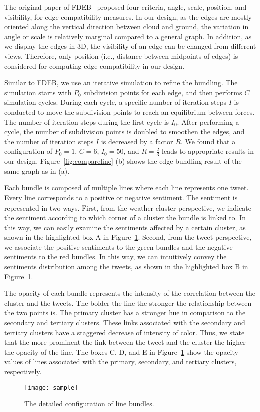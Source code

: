 The original paper of FDEB~\cite{holten2009force} proposed four criteria, angle, scale, position, and visibility, for edge compatibility measures. In our design, as the edges are mostly oriented along the vertical direction between cloud and ground, the variation in angle or scale is relatively marginal compared to a general graph. In addition, as we display the edges in 3D, the visibility of an edge can be changed from different views. Therefore, only position (i.e., distance between midpoints of edges) is considered for computing edge compatibility in our design.

Similar to FDEB, we use an iterative simulation to refine the bundling. The simulation starts with $P_0$ subdivision points for each edge, and then performs $C$ simulation cycles. During each cycle, a specific number of iteration steps $I$ is conducted to move the subdivision points to reach an equilibrium between forces. The number of iteration steps during the first cycle is $I_0$. After performing a cycle, the number of subdivision points is doubled to smoothen the edges, and the number of iteration steps $I$ is decreased by a factor $R$. We found that a configuration of $P_0=1$, $C=6$, $I_0=50$, and $R=\frac{2}{3}$ leads to appropriate results in our design. Figure~\ref{fig:compareline} (b) shows the edge bundling result of the same graph as in (a).

Each bundle is composed of multiple lines where each line represents one tweet. Every line corresponds to a positive or negative sentiment. The sentiment is represented in two ways. First, from the weather cluster perspective, we indicate the sentiment according to which corner of a cluster the bundle is linked to. In this way, we can easily examine the sentiments affected by a certain cluster, as shown in the highlighted box A in Figure~\ref{fig:linedetail}. Second, from the tweet perspective, we associate the positive sentiments to the green bundles and the negative sentiments to the red bundles. In this way, we can intuitively convey the sentiments distribution among the tweets, as shown in the highlighted box B in Figure~\ref{fig:linedetail}.

The opacity of each bundle represents the intensity of the correlation between the cluster and the tweets. The bolder the line the stronger the relationship between the two points is. The primary cluster has a stronger hue in comparison to the secondary and tertiary clusters. These links associated with the secondary and tertiary clusters have a staggered decrease of intensity of color. Thus, we state that the more prominent the link between the tweet and the cluster the higher the opacity of the line. The boxes C, D, and E in Figure~\ref{fig:linedetail} show the opacity values of lines associated with the primary, secondary, and tertiary clusters, respectively.

\begin{figure}[t]
\begin{center}
\texttt{[image: sample]}
\end{center}
\vspace{-.1in}
\caption{The detailed configuration of line bundles.}
\label{fig:linedetail}
\end{figure}
